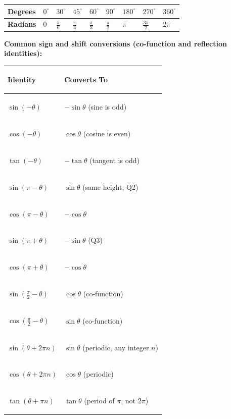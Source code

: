 \documentclass[11pt, letterpaper]{article}
\begin{document}
\noindent
{\small\renewcommand{\arraystretch}{1.4}
\begin{tabularx}{\textwidth}{>{\centering\arraybackslash}X
                              >{\centering\arraybackslash}X
                              >{\centering\arraybackslash}X
                              >{\centering\arraybackslash}X
                              >{\centering\arraybackslash}X
                              >{\centering\arraybackslash}X
                              >{\centering\arraybackslash}X
                              >{\centering\arraybackslash}X
                              >{\centering\arraybackslash}X}
\toprule
\rowcolor{tableheaderpurple}
\textbf{Degrees} & $0^\circ$ & $30^\circ$ & $45^\circ$ & $60^\circ$ & $90^\circ$ & $180^\circ$ & $270^\circ$ & $360^\circ$ \\
\midrule
\rowcolor{rowPu} \textbf{Radians} & $0$ & $\tfrac{\pi}{6}$ & $\tfrac{\pi}{4}$ & $\tfrac{\pi}{3}$ & $\tfrac{\pi}{2}$ & $\pi$ & $\tfrac{3\pi}{2}$ & $2\pi$ \\
\bottomrule
\end{tabularx}}

\vspace{6pt}
\textbf{Common sign and shift conversions (co-function and reflection identities):}

\noindent
{\small\renewcommand{\arraystretch}{1.7}
\begin{tabularx}{\textwidth}{>{\bfseries\raggedright\arraybackslash}p{4.5cm}
                              >{\raggedright\arraybackslash}X}
\toprule
\rowcolor{tableheaderpurple}
\textbf{Identity} & \textbf{Converts To} \\
\midrule
\rowcolor{rowPu} $\sin(-\theta)$    & $-\sin\theta$ \quad (sine is odd) \\
\rowcolor{rowA}  $\cos(-\theta)$    & $\cos\theta$ \quad (cosine is even) \\
\rowcolor{rowPu} $\tan(-\theta)$    & $-\tan\theta$ \quad (tangent is odd) \\
\rowcolor{rowA}  $\sin(\pi - \theta)$   & $\sin\theta$ \quad (same height, Q2) \\
\rowcolor{rowPu} $\cos(\pi - \theta)$   & $-\cos\theta$ \\
\rowcolor{rowA}  $\sin(\pi + \theta)$   & $-\sin\theta$ \quad (Q3) \\
\rowcolor{rowPu} $\cos(\pi + \theta)$   & $-\cos\theta$ \\
\rowcolor{rowA}  $\sin\!\left(\tfrac{\pi}{2} - \theta\right)$ & $\cos\theta$ \quad (co-function) \\
\rowcolor{rowPu} $\cos\!\left(\tfrac{\pi}{2} - \theta\right)$ & $\sin\theta$ \quad (co-function) \\
\rowcolor{rowA}  $\sin(\theta + 2\pi n)$ & $\sin\theta$ \quad (periodic, any integer $n$) \\
\rowcolor{rowPu} $\cos(\theta + 2\pi n)$ & $\cos\theta$ \quad (periodic) \\
\rowcolor{rowA}  $\tan(\theta + \pi n)$  & $\tan\theta$ \quad (period of $\pi$, not $2\pi$) \\
\bottomrule
\end{tabularx}}
\end{document}
